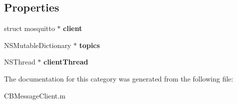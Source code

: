 \subsection*{Properties}
\begin{DoxyCompactItemize}
\item 
\hypertarget{category_c_b_message_client_07_08_a6dd8044dd2d87c74a8274dd2d772d18c}{struct mosquitto $\ast$ {\bfseries client}}\label{category_c_b_message_client_07_08_a6dd8044dd2d87c74a8274dd2d772d18c}

\item 
\hypertarget{category_c_b_message_client_07_08_a98cb473db7bc65baa18098ed8abad00c}{N\-S\-Mutable\-Dictionary $\ast$ {\bfseries topics}}\label{category_c_b_message_client_07_08_a98cb473db7bc65baa18098ed8abad00c}

\item 
\hypertarget{category_c_b_message_client_07_08_ab510d95792c9d50028d6fa2d34a1a995}{N\-S\-Thread $\ast$ {\bfseries client\-Thread}}\label{category_c_b_message_client_07_08_ab510d95792c9d50028d6fa2d34a1a995}

\end{DoxyCompactItemize}


The documentation for this category was generated from the following file\-:\begin{DoxyCompactItemize}
\item 
C\-B\-Message\-Client.\-m\end{DoxyCompactItemize}
